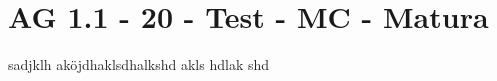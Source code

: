 \section{AG 1.1 - 20 - Test - MC - Matura}

\begin{beispiel}[AG 1.1]{1}
sadjklh aköjdhaklsdhalkshd akls hdlak shd
\end{beispiel}